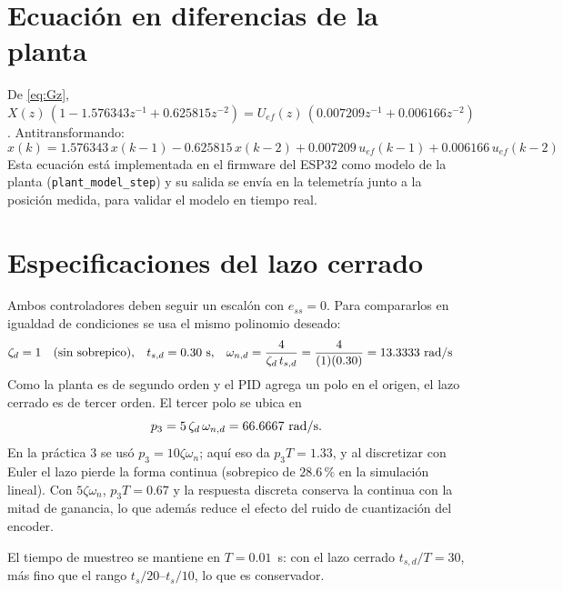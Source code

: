 \documentclass[11pt,letterpaper]{article}
\begin{document}
\section{Ecuación en diferencias de la planta}

De \eqref{eq:Gz}, $X(z)\,(1 - 1.576343z^{-1} + 0.625815z^{-2}) =
U_{ef}(z)\,(0.007209z^{-1} + 0.006166z^{-2})$. Antitransformando:
\begin{equation}
  \boxed{x(k) = 1.576343\,x(k-1) - 0.625815\,x(k-2)
               + 0.007209\,u_{ef}(k-1) + 0.006166\,u_{ef}(k-2)}
\end{equation}
Esta ecuación está implementada en el firmware del ESP32 como modelo de la
planta (\texttt{plant\_model\_step}) y su salida se envía en la telemetría
junto a la posición medida, para validar el modelo en tiempo real.

\section{Especificaciones del lazo cerrado}

Ambos controladores deben seguir un escalón con $e_{ss}=0$. Para compararlos
en igualdad de condiciones se usa el mismo polinomio deseado:
\begin{align}
  \zeta_d &= 1 \quad\text{(sin sobrepico)}, &
  t_{s,d} &= 0.30~\text{s}, &
  \omega_{n,d} &= \frac{4}{\zeta_d\,t_{s,d}} = \frac{4}{(1)(0.30)} = 13.3333~\text{rad/s}
\end{align}
Como la planta es de segundo orden y el PID agrega un polo en el origen, el
lazo cerrado es de tercer orden. El tercer polo se ubica en
\begin{equation}
  p_3 = 5\,\zeta_d\,\omega_{n,d} = 66.6667~\text{rad/s}.
\end{equation}
En la práctica 3 se usó $p_3 = 10\zeta\omega_n$; aquí eso da
$p_3 T = 1.33$, y al discretizar con Euler el lazo pierde la forma continua
(sobrepico de $28.6\,\%$ en la simulación lineal). Con $5\zeta\omega_n$,
$p_3 T = 0.67$ y la respuesta discreta conserva la continua con la mitad de
ganancia, lo que además reduce el efecto del ruido de cuantización del encoder.

El tiempo de muestreo se mantiene en $T = 0.01$~s: con el lazo cerrado
$t_{s,d}/T = 30$, más fino que el rango $t_s/20$--$t_s/10$, lo que es
conservador.

\end{document}
